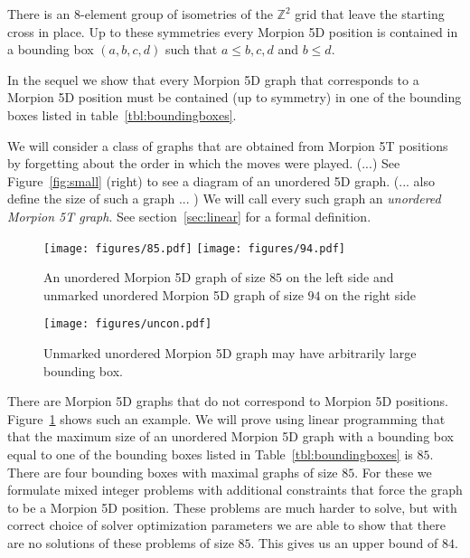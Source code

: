 \documentclass[a4paper,UKenglish]{lipics}
\begin{document}
There is an $8$-element group of isometries of the $\mathbb{Z}^2$ grid that leave the starting cross in place.
Up to these symmetries every Morpion 5D position is contained in a bounding box $(a,b,c,d)$ such that
  $a \leq b,c,d$ and $b \leq d$.

In the sequel we show that every Morpion 5D graph that corresponds to a Morpion 5D position
    must be contained (up to symmetry) in one of the bounding boxes listed in table~\ref{tbl:boundingboxes}.

\begin{table}[ht]
\centering
 

\caption{}
\label{tbl:boundingboxes}
\end{table}

We will consider a class of graphs that are obtained from Morpion 5T positions by forgetting about 
  the order in which the moves were played.
(...) See Figure~\ref{fig:small} (right) to see a diagram of an unordered 5D graph. (... also define the size of such a graph ... )
We will call every such graph an \emph{unordered Morpion 5T graph}. See section~\ref{sec:linear} for a formal definition.

\begin{figure}[h]
    \texttt{[image: figures/85.pdf]}
    \texttt{[image: figures/94.pdf]}
    \caption{\label{fig:85}
      An unordered Morpion 5D graph of size $85$ on the left side
        and unmarked unordered Morpion 5D graph of size $94$ on the right side
    }
\end{figure}

\begin{figure}
  \centering
  \texttt{[image: figures/uncon.pdf]}
  \caption{
    Unmarked unordered Morpion 5D graph may have arbitrarily large bounding box.
  }
\end{figure}

There are Morpion 5D graphs that do not correspond to Morpion 5D positions.
Figure~\ref{fig:85} shows such an example.
We will prove using linear programming that that the maximum size of  an unordered Morpion 5D graph with 
  a bounding box equal to one of the bounding boxes listed in Table~\ref{tbl:boundingboxes}
  is $85$.
There are four bounding boxes with maximal graphs of size $85$. 
For these we formulate mixed integer problems with additional constraints that force the graph to
  be a Morpion 5D position.
These problems are much harder to solve, but with correct choice of solver optimization parameters we are able to show
  that there are no solutions of these problems of size $85$.
This gives us an upper bound of $84$.
\end{document}
